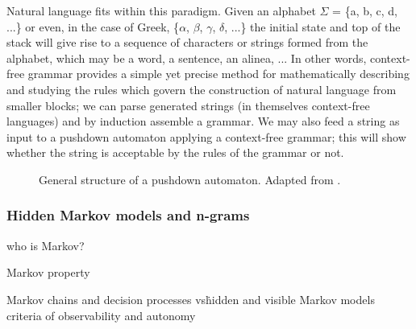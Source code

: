 Natural language fits within this paradigm. Given an alphabet $\Sigma$ = \{a,
b, c, d, ...\} or even, in the case of Greek, \{$\alpha$, $\beta$, $\gamma$,
$\delta$, ...\} the initial state and top of the stack will give rise to a
sequence of characters or strings formed from the alphabet, which may be a
word, a sentence, an alinea, ... In other words, context-free grammar provides
a simple yet precise method for mathematically describing and studying the
rules which govern the construction of natural language from smaller blocks; we
can parse generated strings (in themselves context-free languages) and by
induction assemble a grammar. We may also feed a string as input to a pushdown
automaton applying a context-free grammar; this will show whether the string is
acceptable by the rules of the grammar or not.

\begin{figure}
  \begin{center}
\end{center}
\caption{General structure of a pushdown automaton. Adapted from \citet[220]{hopcroft2001}.} \label{fig:pushdownautomaton}
\end{figure}

\subsubsection{Hidden Markov models and n-grams} %
\label{ssub:markovchains}

who is Markov?

Markov property

Markov chains and decision processes vs\. hidden and visible Markov models
  criteria of observability and autonomy

